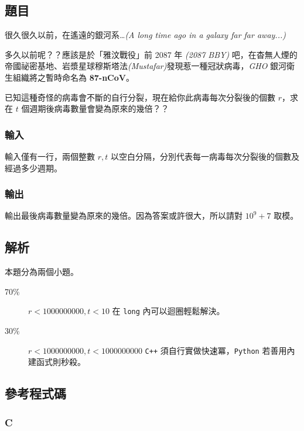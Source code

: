 \documentclass[a4paper,10pt]{article}
\begin{document}
\subsection{題目}

很久很久以前，在遙遠的銀河系…\textit{(A long time ago in a galaxy far far away...)}

多久以前呢？？應該是於「雅汶戰役」前 2087 年 \textit{(2087 BBY)} 吧，在杳無人煙的帝國祕密基地、岩漿星球穆斯塔法\textit{(Mustafar)}發現惹一種冠狀病毒，\textsl{GHO} 銀河衛生組織將之暫時命名為 \textbf{87-nCoV}。

已知這種奇怪的病毒會不斷的自行分裂，現在給你此病毒每次分裂後的個數 $r$，求在 $t$ 個週期後病毒數量會變為原來的幾倍？？

\subsubsection{輸入}

輸入僅有一行，兩個整數 $r, t$ 以空白分隔，分別代表每一病毒每次分裂後的個數及經過多少週期。

\subsubsection{輸出}

輸出最後病毒數量變為原來的幾倍。因為答案或許很大，所以請對 $10^9+7$ 取模。

\subsection{解析}

本題分為兩個小題。

\begin{description}
    \item[70\%] $r < 1000000000, t < 10$ 在 \texttt{long} 內可以迴圈輕鬆解決。
    \item[30\%] $r < 1000000000, t < 1000000000$ \texttt{C++} 須自行實做快速冪，\texttt{Python} 若善用內建函式則秒殺。
\end{description}

\subsection{參考程式碼}

\subsubsection{C}
\end{document}

